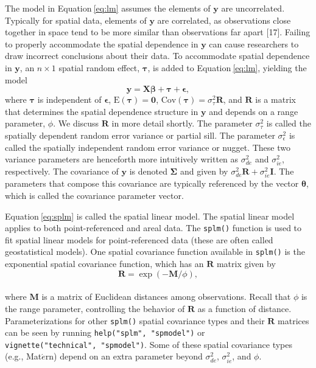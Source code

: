 \documentclass[10pt,letterpaper]{article}
\begin{document}
The model in Equation\(~\)\ref{eq:lm} assumes the elements of
\(\mathbf{y}\) are uncorrelated. Typically for spatial data, elements of
\(\mathbf{y}\) are correlated, as observations close together in space
tend to be more similar than observations far apart {[}17{]}. Failing to
properly accommodate the spatial dependence in \(\mathbf{y}\) can cause
researchers to draw incorrect conclusions about their data. To
accommodate spatial dependence in \(\mathbf{y}\), an \(n \times 1\)
spatial random effect, \(\boldsymbol{\tau}\), is added to
Equation\(~\)\ref{eq:lm}, yielding the model
\begin{equation}\label{eq:splm}
 \mathbf{y} = \mathbf{X} \boldsymbol{\beta} + \boldsymbol{\tau} + \boldsymbol{\epsilon},
\end{equation} where \(\boldsymbol{\tau}\) is independent of
\(\boldsymbol{\epsilon}\), \(\text{E}(\boldsymbol{\tau}) = \mathbf{0}\),
\(\text{Cov}(\boldsymbol{\tau}) = \sigma^2_\tau \mathbf{R}\), and
\(\mathbf{R}\) is a matrix that determines the spatial dependence
structure in \(\mathbf{y}\) and depends on a range parameter, \(\phi\).
We discuss \(\mathbf{R}\) in more detail shortly. The parameter
\(\sigma^2_\tau\) is called the spatially dependent random error
variance or partial sill. The parameter \(\sigma^2_\epsilon\) is called
the spatially independent random error variance or nugget. These two
variance parameters are henceforth more intuitively written as
\(\sigma^2_{de}\) and \(\sigma^2_{ie}\), respectively. The covariance of
\(\mathbf{y}\) is denoted \(\boldsymbol{\Sigma}\) and given by
\(\sigma^2_{de} \mathbf{R} + \sigma^2_{ie} \mathbf{I}\). The parameters
that compose this covariance are typically referenced by the vector
\(\boldsymbol{\theta}\), which is called the covariance parameter
vector.

Equation\(~\)\ref{eq:splm} is called the spatial linear model. The
spatial linear model applies to both point-referenced and areal data.
The \texttt{splm()} function is used to fit spatial linear models for
point-referenced data (these are often called geostatistical models).
One spatial covariance function available in \texttt{splm()} is the
exponential spatial covariance function, which has an \(\mathbf{R}\)
matrix given by \begin{equation*}
  \mathbf{R} = \exp(-\mathbf{M} / \phi),
\end{equation*}\\
where \(\mathbf{M}\) is a matrix of Euclidean distances among
observations. Recall that \(\phi\) is the range parameter, controlling
the behavior of \(\mathbf{R}\) as a function of distance.
Parameterizations for other \texttt{splm()} spatial covariance types and
their \(\mathbf{R}\) matrices can be seen by running
\texttt{help("splm",\ "spmodel")} or
\texttt{vignette("technical",\ "spmodel")}. Some of these spatial
covariance types (e.g., Mat\(\acute{e}\)rn) depend on an extra parameter
beyond \(\sigma^2_{de}\), \(\sigma^2_{ie}\), and \(\phi\).
\end{document}
